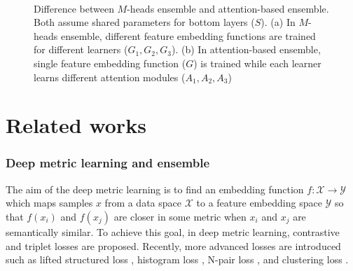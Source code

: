 \documentclass[runningheads]{llncs}
\begin{document}
\begin{figure}[t]
\begin{center}
    \mbox{
    }
\end{center}
\vspace{-7mm}
\caption{Difference between $M$-heads ensemble and attention-based ensemble.
Both assume shared parameters for bottom layers ($S$).
(a) In $M$-heads ensemble, different feature embedding functions are trained for different learners ($G_1, G_2, G_3$).
(b) In attention-based ensemble, single feature embedding function ($G$) is trained while each learner learns different attention modules ($A_1, A_2, A_3$)
\vspace{-6mm}
}
\label{fig:m_heads_and_m_way}
\end{figure}
 
\vspace{-2mm}
\section{Related works}
\vspace{-3mm}
\subsubsection{Deep metric learning and ensemble}
\label{sec:ensemble}

The aim of the deep metric learning is to find an embedding function $f: \mathcal{X} \rightarrow \mathcal{Y}$ which maps samples ${x}$ from a data space $\mathcal{X}$ to a feature embedding space $\mathcal{Y}$ so that $f({x}_i)$ and $f({x}_j)$ are closer in some metric when ${x}_i$ and ${x}_j$ are semantically similar.
To achieve this goal, in deep metric learning, contrastive \cite{hadsell2006dimensionality,chopra2005learning} and triplet \cite{weinberger2009distance,schroff2015facenet} losses are proposed.
Recently, more advanced losses are introduced such as lifted structured loss \cite{oh2016deep}, histogram loss \cite{ustinova2016learning}, N-pair loss \cite{sohn2016improved}, and clustering loss \cite{song2017deep,law2017deep}.
\end{document}
